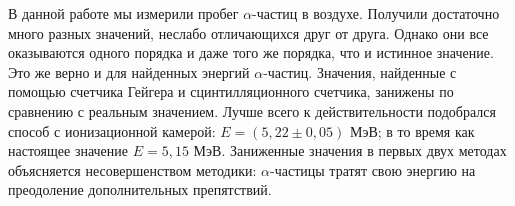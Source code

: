 	В данной работе мы измерили пробег $\alpha$-частиц в воздухе. Получили достаточно много разных значений, неслабо отличающихся друг от друга. Однако они все оказываются одного порядка и даже того же порядка, что и истинное значение. Это же верно и для найденных энергий $\alpha$-частиц. Значения, найденные с помощью счетчика Гейгера и сцинтилляционного счетчика, занижены по сравнению с реальным значением. Лучше всего к действительности подобрался способ с ионизационной камерой: $E = (5,22 \pm 0,05)$ МэВ; в то время как настоящее значение $E = 5,15$ МэВ. Заниженные значения в первых двух методах объясняется несовершенством методики: $\alpha$-частицы тратят свою энергию на преодоление дополнительных препятствий. 
	
	
	
